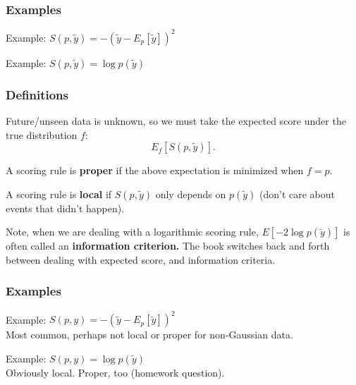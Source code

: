 \documentclass{beamer}
\begin{document}
\begin{frame}
\frametitle{Examples}


Example: $S(p,\tilde{y}) = -(\tilde{y} - E_p[\tilde{y}])^2$
\newline


Example: $S(p,\tilde{y}) = \log p(\tilde{y})$
\newline


\end{frame}

\begin{frame}
\frametitle{Definitions}

Future/unseen data is unknown, so we must take the expected score under the true distribution $f$:
$$
E_f[S(p,\tilde{y})].
$$

A scoring rule is {\bf proper} if the above expectation is minimized when $f = p$.
\newline

A scoring rule is {\bf local} if $S(p,\tilde{y})$ only depends on $p(\tilde{y})$ (don't care about events that didn't happen).
\newline

Note, when we are dealing with a logarithmic scoring rule, $E[-2\log p(\tilde{y})]$ is often called an {\bf information criterion.} The book switches back and forth between dealing with expected score, and information criteria. 

\end{frame}

\begin{frame}
\frametitle{Examples}


Example: $S(p,y) = -(\tilde{y} - E_p[\tilde{y}])^2$ \\
Most common, perhaps not local or proper for non-Gaussian data.
\newline

Example: $S(p,y) = \log p(\tilde{y})$\\
Obviously local. Proper, too (homework question).


\end{frame}
\end{document}
